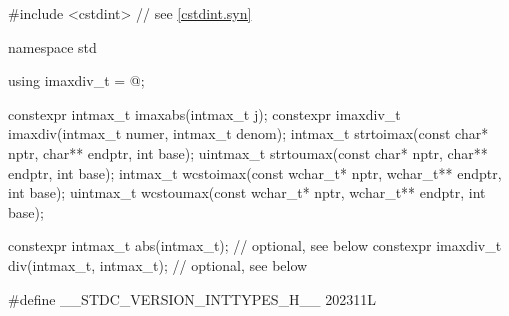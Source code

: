 \begin{codeblock}
#include <cstdint>  // see \ref{cstdint.syn}

namespace std {
  using imaxdiv_t = @\seebelow@;

  constexpr intmax_t imaxabs(intmax_t j);
  constexpr imaxdiv_t imaxdiv(intmax_t numer, intmax_t denom);
  intmax_t strtoimax(const char* nptr, char** endptr, int base);
  uintmax_t strtoumax(const char* nptr, char** endptr, int base);
  intmax_t wcstoimax(const wchar_t* nptr, wchar_t** endptr, int base);
  uintmax_t wcstoumax(const wchar_t* nptr, wchar_t** endptr, int base);

  constexpr intmax_t abs(intmax_t);             // optional, see below
  constexpr imaxdiv_t div(intmax_t, intmax_t);  // optional, see below
}

#define __STDC_VERSION_INTTYPES_H__ 202311L


\end{codeblock}
